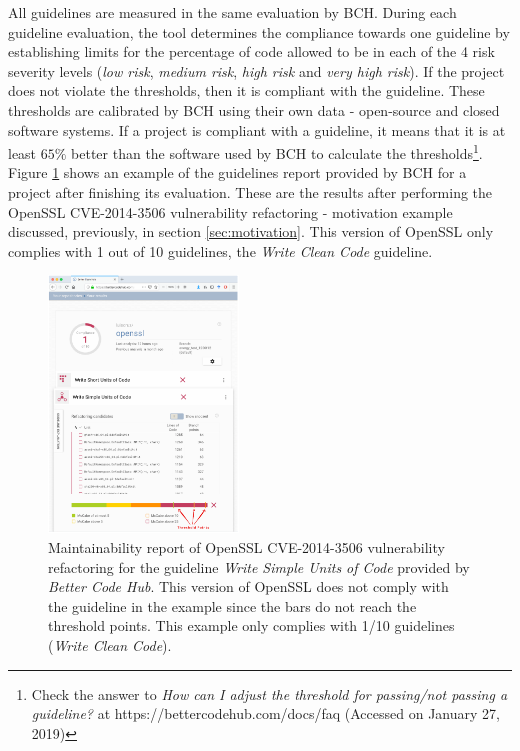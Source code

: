 \documentclass[10pt,conference]{IEEEtran}
\begin{document}
All guidelines are measured in the same evaluation by BCH. During each guideline evaluation, the tool determines the compliance towards one guideline by establishing limits for the percentage of code allowed to be in each of the 4 risk severity levels (\emph{low risk}, \emph{medium risk}, \emph{high risk} and \emph{very high risk}). If the project does not violate the thresholds, then it is compliant with the guideline. These thresholds are calibrated by BCH using their own data - open-source and closed software systems. If a project is compliant with a guideline, it means that it is at least $65\%$ better than the software used by BCH to calculate the thresholds\footnote{Check the answer to \emph{How can I adjust the threshold for passing/not passing a guideline?} at https://bettercodehub.com/docs/faq (Accessed on January 27, 2019)}. Figure \ref{fig:bchrep} shows an example of the  guidelines report provided by BCH for a project after finishing its evaluation. These are the results after performing the OpenSSL CVE-2014-3506 vulnerability refactoring - motivation example discussed, previously, in section \ref{sec:motivation}. This version of OpenSSL only complies with 1 out of 10 guidelines, the \emph{Write Clean Code} guideline.

\begin{figure}[H]
 	\centering 	\includegraphics[width=0.45\textwidth]{figures/bch_report.png}
 	\caption{Maintainability report of OpenSSL CVE-2014-3506 vulnerability refactoring for the guideline \emph{Write Simple Units of Code} provided by \emph{Better Code Hub}. This version of OpenSSL does not comply with the guideline in the example since the bars do not reach the threshold points. This example only complies with 1/10 guidelines (\emph{Write Clean Code}).}
	\label{fig:bchrep}
\end{figure}
\end{document}
